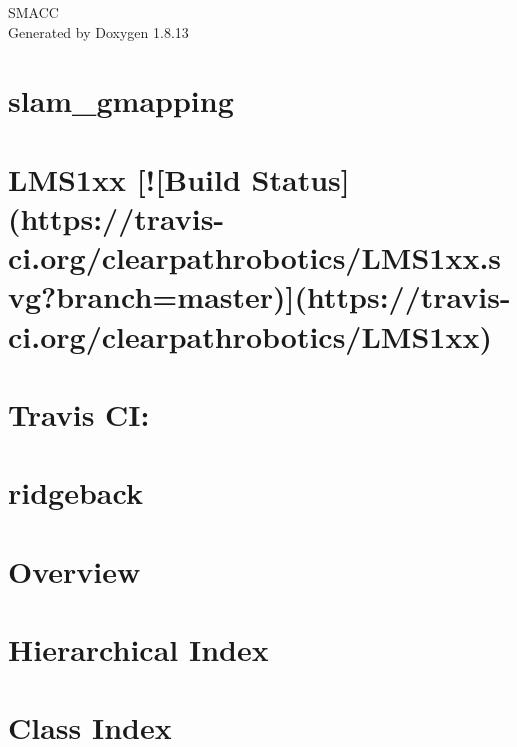 \documentclass[twoside]{book}
\newcommand{\+}{\discretionary{\mbox{\scriptsize$\hookleftarrow$}}{}{}}
\newcommand{\clearemptydoublepage}{%
  \newpage{\pagestyle{empty}\cleardoublepage}%
}
\begin{document}
\hypersetup{pageanchor=false,
             bookmarksnumbered=true,
             pdfencoding=unicode
            }
\begin{titlepage}
\vspace*{7cm}
\begin{center}%
{\Large S\+M\+A\+CC }\\
\vspace*{1cm}
{\large Generated by Doxygen 1.8.13}\\
\end{center}
\end{titlepage}
\clearemptydoublepage
{}
\tableofcontents
\clearemptydoublepage
{}
\hypersetup{pageanchor=true}

\chapter{slam\+\_\+gmapping}
\label{index}\hypertarget{index}{}
\chapter{L\+M\+S1xx \mbox{[}!\mbox{[}Build Status\mbox{]}(https\+://travis-\/ci.org/clearpathrobotics/\+L\+M\+S1xx.svg?branch=master)\mbox{]}(https\+://travis-\/ci.org/clearpathrobotics/\+L\+M\+S1xx)}
\label{md_LMS1xx_README}

\chapter{Travis CI\+:}
\label{md_README}

\chapter{ridgeback}
\label{md_ridgeback_README}

\chapter{Overview}
\label{md_rosdoc_lite_README}

\chapter{Hierarchical Index}

\chapter{Class Index}

\end{document}
